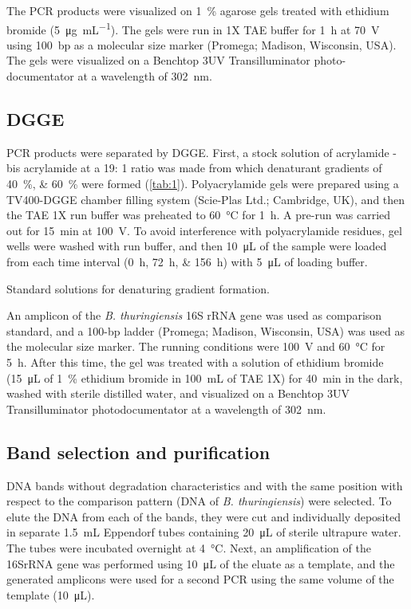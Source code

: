\documentclass{univsciauth}
\begin{document}
The PCR products were visualized on \SI{1}{\%} agarose gels treated with
ethidium bromide (\SI{5}{\micro g.mL^{-1}}). The gels were run in 1X TAE buffer for \SI{1}{h}
at \SI{70}{V} using \SI{100}{bp} as a molecular size marker (Promega; Madison,
Wisconsin, USA). The gels were visualized on a Benchtop 3UV
Transilluminator photo-documentator at a wavelength of \SI{302}{nm}.

\subsection{DGGE}
PCR products were separated by DGGE. First, a stock solution of
acrylamide - bis acrylamide at a 19: 1 ratio was made from which
denaturant gradients of \SIlist{40;60}{\%} were formed (\autoref{tab:1}).
Polyacrylamide gels were prepared using a TV400-DGGE chamber filling
system (Scie-Plas Ltd.; Cambridge, UK), and then the TAE 1X run buffer
was preheated to \SI{60}{\celsius} for \SI{1}{h}. A pre-run was carried out for
\SI{15}{min} at
\SI{100}{V}. To avoid interference with polyacrylamide residues, gel wells
were washed with run buffer, and then \SI{10}{\micro\liter} of the sample were loaded
from each time interval (\SIlist{0;72;156}{h}) with \SI{5}{\micro\liter} of loading buffer.
\begin{table}[t!]
        \centering
        \caption{
                Standard solutions for denaturing gradient
                formation.
        }\label{tab:1}
        
\end{table}

An amplicon of the \emph{B. thuringiensis} 16S rRNA gene was used as
comparison standard, and a 100-bp ladder (Promega; Madison, Wisconsin,
USA) was used as the molecular size marker. The running conditions were
\SI{100}{V} and \SI{60}{\celsius} for \SI{5}{h}. After this time, the gel was treated with a
solution of ethidium bromide (\SI{15}{μL} of \SI{1}{\%} ethidium bromide in \SI{100}{mL} of
TAE 1X) for \SI{40}{min} in the dark, washed with sterile distilled water, and
visualized on a Benchtop 3UV Transilluminator photodocumentator at a
wavelength of \SI{302}{nm}.

\subsection{Band selection and purification}
DNA bands without degradation characteristics and with the same position
with respect to the comparison pattern (DNA of \emph{B. thuringiensis})
were selected. To elute the DNA from each of the bands, they were cut
and individually deposited in separate \SI{1.5}{mL} Eppendorf tubes containing
\SI{20}{\micro\liter} of sterile ultrapure water. The tubes were incubated overnight at
\SI{4}{\celsius}. Next, an amplification of the 16SrRNA gene was performed using
\SI{10}{\micro\liter} of the eluate as a template, and the generated amplicons were used
for a second PCR using the same volume of the template (\SI{10}{\micro\liter}).
\end{document}
